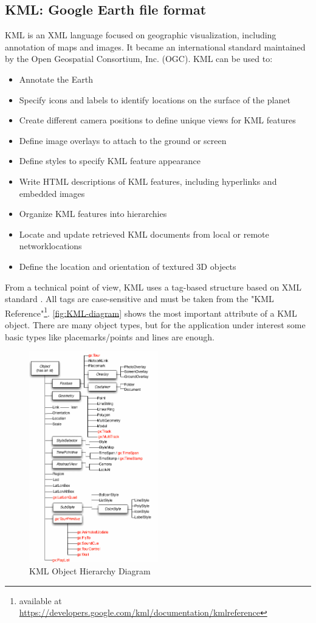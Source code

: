 \subsection{KML: Google Earth file format} %
\label{sub:kml_google_earth_file_format}
KML is an XML language focused on geographic visualization, including annotation of maps and images.
It became an international standard maintained by the Open Geospatial Consortium, Inc. (OGC).
KML can be used to:
\begin{itemize}
\item Annotate the Earth
\item Specify icons and labels to identify locations on the surface of the planet
\item Create different camera positions to define unique views for KML features
\item Define image overlays to attach to the ground or screen
\item Define styles to specify KML feature appearance
\item Write HTML descriptions of KML features, including hyperlinks and embedded images
\item Organize KML features into hierarchies
\item Locate and update retrieved KML documents from local or remote networklocations
\item Define the location and orientation of textured 3D objects
\end{itemize}

From a technical point of view, KML uses a tag-based structure based on XML standard \cite{bray06xml11}. All tags are case-sensitive and must be taken from the "KML Reference"\footnote{available at \url{https://developers.google.com/kml/documentation/kmlreference}}. \autoref{fig:KML-diagram} shows the most important attribute of a KML object. There are many object types, but for the application under interest some basic types like placemarks/points and lines are enough.
\begin{figure}[ht]
    \centering
    \includegraphics[width=0.5\textwidth]{figures/C2/KML-classTree.png}
    \caption{KML Object Hierarchy Diagram}
    \label{fig:KML-diagram}
\end{figure}

